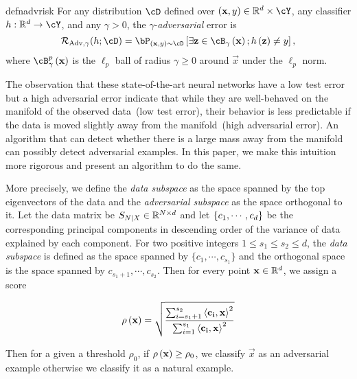 \begin{restatable}{defn}{advrisk}\label{defn:adv_risk} For any distribution $\cD$
  defined over $\br{\vec{x},y}\in\reals^d\times\cY$, any classifier
  $h:\reals^d\rightarrow\cY$, and any $\gamma>0$, 
  the $\gamma$-\emph{adversarial} error is 
          \begin{equation} 
              \radv{\gamma}{h;\cD}=\bP_{\br{\vec{x},y} 
              \sim\cD}\bs{\exists \vec{z}\in\cB_{\gamma}
              \br{\vec{x}};h\br{\vec{z}}\neq y},
          \end{equation} 
  where $\cB_\gamma^p\br{\vec{x}}$ is the $\ell_p$ ball of radius $\gamma \ge
  0$ around $\vec{x}$ under the $\ell_p$ norm.
\end{restatable}

The observation that these state-of-the-art neural networks have a low test
error but a high adversarial error indicate that while they are well-behaved on
the manifold of the observed data~(low test error), their behavior is less
predictable if the data is moved slightly away from the manifold~(high
adversarial error). An algorithm that can detect whether there is a large mass away from the manifold can possibly detect adversarial examples. In this paper, we make this intuition more rigorous and present an algorithm to do the same.

More precisely, we define the {\em data subspace} as the space spanned by the
top eigenvectors of the data and the {\em adversarial subspace} as the space
orthogonal to it. Let the data matrix be \(S_{N\vert X}\in\mathbb{R}^{N\times d}\)
and let \(\left\{{c_1,\cdots,c_d}\right\}\) be the corresponding principal components in descending order of the variance of data explained by each component. For two positive integers \(1\le s_1\le s_2\le d\), the {\em data subspace} is defined as the space spanned by \(\{c_1,\cdots,c_{s_1}\}\) and the orthogonal space is the space spanned by \(c_{s_1+1},\cdots,c_{s_2}\). Then for every point \({\mathbf{x}}\in\mathbb{R}^d\), we assign a score 

\begin{equation}
  \rho\left({{\mathbf{x}}}\right) = \sqrt{\dfrac{\sum_{i=s_1+1}^{s_2}\left\langle{{\mathbf{c_i}}},{{\mathbf{x}}}\right\rangle^2}{ \sum_{i=1}^{s_1} \left\langle{{\mathbf{c_i}}},{{\mathbf{x}}}\right\rangle^2}}
\end{equation}

Then for a given a threshold \(\rho_0\), if \(\rho\left({{\mathbf{x}}}\right)\ge \rho_0\), we classify \(\vec{x}\) as an adversarial example otherwise we classify it as a natural example.
